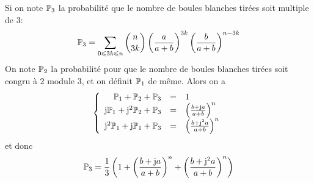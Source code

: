 \begin{remark}
    Si on note $\P_{3}$ la probabilité que le nombre de boules blanches tirées soit multiple de 3:
    \begin{equation}
        \P_{3}=\sum_{0\leqslant 3k\leqslant n}\binom{n}{3k}\left(\frac{a}{a+b}\right)^{3k}\left(\frac{b}{a+b}\right)^{n-3k}
    \end{equation}
    On note $\P_{2}$ la probabilité pour que le nombre de boules blanches tirées soit congru à 2 module 3, et on définit $\P_{1}$ de même.
    Alors on a 
    \begin{equation}
        \left\{
            \begin{array}[]{rcl}
                \P_{1}+\P_{2}+\P_{3} &= &1\\
                \mathrm{j}\P_{1}+\mathrm{j}^{2}\P_{2}+\P_{3} &= &\left(\frac{b+\mathrm{j}a}{a+b}\right)^{n}\\
                \mathrm{j}^{2}\P_{1}+\mathrm{j}\P_{1}+\P_{3} &= &\left(\frac{b+\mathrm{j}^{2}a}{a+b}\right)^{n}
            \end{array}
        \right.
    \end{equation}
    et donc 
    \begin{equation}
        \P_{3}=\frac{1}{3}\left(1+\left(\frac{b+\mathrm{j}a}{a+b}\right)^{n}+\left(\frac{b+\mathrm{j}^{2}a}{a+b}\right)^{n}\right)
    \end{equation}
\end{remark}

